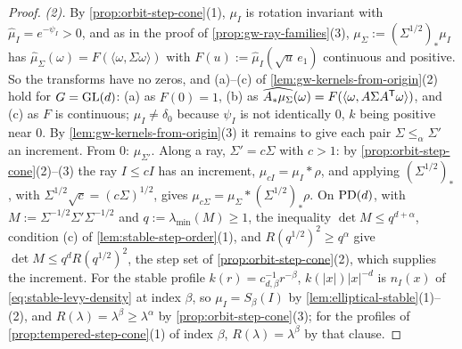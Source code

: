 \begin{proof}
\emph{(2).} By \ref{prop:orbit-step-cone}(1), $\mu_I$ is rotation invariant with
$\widehat\mu_I = e^{-\psi_I} > 0$, and as in the proof of \ref{prop:gw-ray-families}(3),
$\mu_\Sigma := (\Sigma^{1/2})_*\mu_I$ has $\widehat\mu_\Sigma(\omega) = F(\langle\omega,\Sigma\omega\rangle)$ with
$F(u) := \widehat\mu_I(\sqrt u\,e_1)$ continuous and positive. So the transforms have no zeros, and (a)--(c)
of \ref{lem:gw-kernels-from-origin}(2) hold for $G = \mathrm{GL}(d)$: (a) as $F(0) = 1$, (b) as
$\widehat{A_*\mu_\Sigma}(\omega) = F(\langle\omega,A\Sigma A^{\mathsf{T}}\omega\rangle)$, and (c) as $F$ is
continuous; $\mu_I \ne \delta_0$ because
$\psi_I$ is not identically $0$, $k$ being positive near $0$. By
\ref{lem:gw-kernels-from-origin}(3) it remains to give each pair $\Sigma \le_\alpha \Sigma'$ an increment.
From $0$: $\mu_{\Sigma'}$. Along a ray, $\Sigma' = c\Sigma$ with $c > 1$: by \ref{prop:orbit-step-cone}(2)--(3)
the ray $I \le cI$ has an increment, $\mu_{cI} = \mu_I * \rho$, and applying $(\Sigma^{1/2})_*$, with
$\Sigma^{1/2}\sqrt c = (c\Sigma)^{1/2}$, gives $\mu_{c\Sigma} = \mu_\Sigma * (\Sigma^{1/2})_*\rho$. On
$\mathrm{PD}(d)$, with $M := \Sigma^{-1/2}\Sigma'\Sigma^{-1/2}$ and $q := \lambda_{\min}(M) \ge 1$, the inequality
$\det M \le q^{d+\alpha}$, condition (c) of \ref{lem:stable-step-order}(1), and $R(q^{1/2})^2 \ge q^\alpha$
give $\det M \le q^dR(q^{1/2})^2$, the step set of
\ref{prop:orbit-step-cone}(2), which supplies the increment. For the stable profile
$k(r) = c_{d,\beta}^{-1}r^{-\beta}$, $k(|x|)|x|^{-d}$ is $n_I(x)$ of \ref{eq:stable-levy-density} at index
$\beta$, so $\mu_I = S_\beta(I)$ by \ref{lem:elliptical-stable}(1)--(2), and $R(\lambda) = \lambda^\beta \ge
\lambda^\alpha$ by \ref{prop:orbit-step-cone}(3); for the profiles of \ref{prop:tempered-step-cone}(1) of index
$\beta$, $R(\lambda) = \lambda^\beta$ by that clause.
\end{proof}

